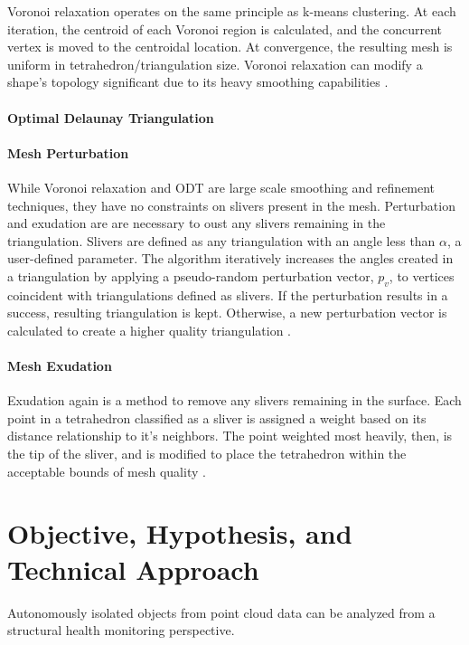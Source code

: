 \documentclass[12pt]{drexelthesis}
\let\Oldsubsubsection\subsubsection
\renewcommand{\subsubsection}{\FloatBarrier\Oldsubsubsection}
\begin{document}
Voronoi  relaxation  operates  on  the  same  principle  as  k-means  clustering.  At  each  iteration,  the  centroid  of  each  Voronoi  region  is  calculated,  and  the  concurrent  vertex  is  moved  to  the  centroidal  location.  At  convergence,  the  resulting  mesh  is  uniform  in  tetrahedron/triangulation  size.  Voronoi  relaxation  can  modify  a  shape’s  topology  significant  due  to  its  heavy  smoothing  capabilities  \cite{RN61}.

\subsubsection{Optimal Delaunay Triangulation}

\subsubsection{Mesh Perturbation}
While  Voronoi  relaxation  and  ODT  are  large  scale  smoothing  and  refinement  techniques,  they  have  no  constraints  on  slivers  present  in  the  mesh.  Perturbation  and  exudation  are  are  necessary  to  oust  any  slivers  remaining  in  the  triangulation.  Slivers  are  defined  as  any  triangulation  with  an  angle  less  than  $\alpha$,  a  user-defined  parameter.  The  algorithm  iteratively  increases  the  angles  created  in  a  triangulation  by  applying  a  pseudo-random  perturbation  vector,  $p_{v}$,  to  vertices  coincident  with  triangulations  defined  as  slivers.  If  the  perturbation  results  in  a  success,  resulting  triangulation  is  kept.  Otherwise,  a  new  perturbation  vector  is  calculated  to  create  a  higher  quality  triangulation  \cite{RN31}. 

\subsubsection{Mesh Exudation}
Exudation  again  is  a  method  to  remove  any  slivers  remaining  in  the  surface.  Each  point  in  a  tetrahedron  classified  as  a  sliver  is  assigned  a  weight  based  on  its distance  relationship  to  it’s  neighbors.  The  point  weighted  most  heavily,  then,  is  the  tip  of  the  sliver,  and  is  modified  to  place  the  tetrahedron  within  the  acceptable  bounds  of  mesh  quality  \cite{RN38}. 


\chapter{Objective, Hypothesis, and Technical Approach}
\label{chap:purposestatement}
Autonomously isolated objects from point cloud data can be analyzed from a structural health monitoring perspective. 
\end{document}
